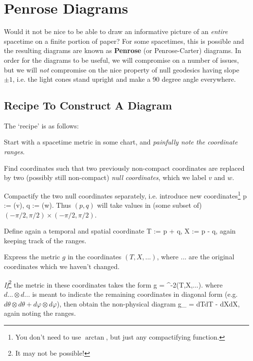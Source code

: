 \chapter{Penrose Diagrams}

Would it not be nice to be able to draw an informative picture of an \textit{entire} spacetime on a finite portion of paper? For some spacetimes, this is possible and the resulting diagrams are known as \textbf{Penrose} (or Penrose-Carter) diagrams. In order for the diagrams to be useful, we will compromise on a number of issues, but we will \textit{not} compromise on the nice property of null geodesics having slope $\pm1$, i.e. the light cones stand upright and make a 90 degree angle everywhere.

\section{Recipe To Construct A Diagram}

The `recipe' is as follows:
\benr 
    \item Start with a spacetime metric in some chart, and \textit{painfully note the coordinate ranges}.
    \item Find coordinates such that two previously non-compact coordinates are replaced by two (possibly still non-compact) \textit{null coordinates}, which we label $v$ and $w$.
    \item Compactify the two null coordinates separately, i.e. introduce new coordinates\footnote{You don't need to use $\arctan$, but just any compactifying function.}
    \bse 
        p := \arctan(v), \qand q := \arctan(w).
    \ese 
    Thus $(p,q)$ will take values in (some subset of) $(-\pi/2,\pi/2)\times(-\pi/2,\pi/2)$.
    \item Define again a temporal and spatial coordinate 
    \bse 
        T := p + q, \qand X := p - q,
    \ese 
    again keeping track of the ranges. 
    \item Express the metric $g$ in the coordinates $(T,X,...)$, where $...$ are the original coordinates which we haven't changed. 
    \item \textit{If}\footnote{It may not be possible!} the metric in these coordinates takes the form 
    \bse 
        g = \Omega^{-2}(T,X,...).
    \ese
    where $d...\otimes d...$ is meant to indicate the remaining coordinates in diagonal form (e.g. $d\theta\otimes d\theta + d\varphi\otimes d\varphi$), then obtain the non-physical diagram
    \bse 
        g_{} = dT\otimes dT - dX\otimes dX,
    \ese 
    again noting the ranges.
\een 

